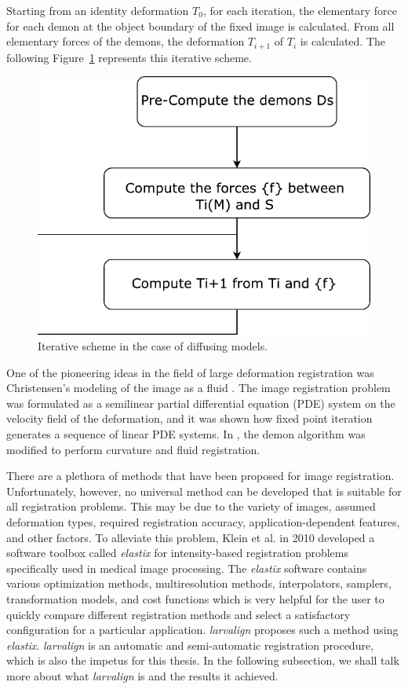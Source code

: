\documentclass{book}
\begin{document}
	Starting from an identity deformation {$T_0$}, for each iteration, the elementary force for each demon at the object boundary of the fixed image is calculated. From all elementary forces of the demons, the deformation $T_{i+1}$ of $T_i$ is calculated. The following Figure~\ref{fig:demons} represents this iterative scheme.
	
	\begin{figure}[h!]
		\centering
		\includegraphics[width=0.7\columnwidth]{resources/chapter2/Demons.pdf}
		\caption{Iterative scheme in the case of diffusing models. \cite{THIRION1998243}}
		\label{fig:demons}
	\end{figure}
	
	One of the pioneering ideas in the field of large deformation registration was Christensen's modeling of the image as a fluid \cite{536892}. The image registration problem was formulated as a semilinear partial differential equation (PDE) system on the velocity field of the deformation, and it was shown how fixed point iteration generates a sequence of linear PDE systems. In \cite{5193151}, the demon algorithm was modified to perform curvature and fluid registration.
	
	There are a plethora of methods that have been proposed for image registration. Unfortunately, however, no universal method can be developed that is suitable for all registration problems. This may be due to the variety of images, assumed deformation types, required registration accuracy, application-dependent features, and other factors. To alleviate this problem, Klein et al. \cite{5338015} in 2010 developed a software toolbox called \emph{elastix} for intensity-based registration problems specifically used in medical image processing. The \emph{elastix} software contains various optimization methods, multiresolution methods, interpolators, samplers, transformation models, and cost functions which is very helpful for the user to quickly compare different registration methods and select a satisfactory configuration for a particular application. \emph{{larvalign}} \cite{larvalign} proposes such a method using \emph{elastix}. \emph{{larvalign}} \cite{larvalign} is an automatic and semi-automatic registration procedure, which is also the impetus for this thesis. In the following subsection, we shall talk more about what \emph{{larvalign}} is and the results it achieved.
	
\end{document}
